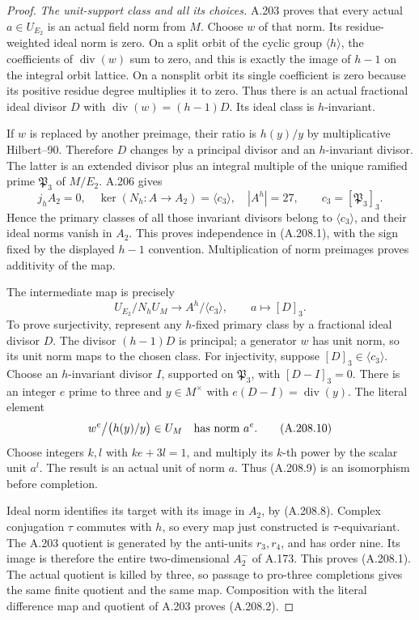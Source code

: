 \begin{proof}
\emph{The unit-support class and all its choices.}
A.203 proves that every actual \(a\in U_{E_2}\) is an actual
field norm from \(M\).  Choose \(w\) of that norm.  Its
residue-weighted ideal norm is zero.  On a split orbit of the
cyclic group \(\langle h\rangle\), the coefficients of
\(\operatorname{div}(w)\) sum to zero, and this is exactly the
image of \(h-1\) on the integral orbit lattice.  On a nonsplit
orbit its single coefficient is zero because its positive
residue degree multiplies it to zero.  Thus there is an actual
fractional ideal divisor \(D\) with
\(\operatorname{div}(w)=(h-1)D\).  Its ideal class is
\(h\)-invariant.

If \(w\) is replaced by another preimage, their ratio is
\(h(y)/y\) by multiplicative Hilbert--90.  Therefore \(D\)
changes by a principal divisor and an \(h\)-invariant divisor.
The latter is an extended divisor plus an integral multiple
of the unique ramified prime \(\mathfrak P_3\) of \(M/E_2\).
A.206 gives
\[
 j_hA_2=0,\quad
 \ker(N_h:A\to A_2)=\langle c_3\rangle,
 \quad |A^h|=27,
 \qquad c_3=[\mathfrak P_3]_3.
\tag{A.208.8}
\]
Hence the primary classes of all those invariant divisors
belong to \(\langle c_3\rangle\), and their ideal norms
vanish in \(A_2\).  This proves independence in (A.208.1),
with the sign fixed by the displayed \(h-1\) convention.
Multiplication of norm preimages proves additivity of the map.

The intermediate map is precisely
\[
 U_{E_2}/N_hU_M\longrightarrow A^h/\langle c_3\rangle,
                   \qquad a\longmapsto[D]_3.
\tag{A.208.9}
\]
To prove surjectivity, represent any \(h\)-fixed primary
class by a fractional ideal divisor \(D\).  The divisor
\((h-1)D\) is principal; a generator \(w\) has unit norm,
so its unit norm maps to the chosen class.  For injectivity,
suppose \([D]_3\in\langle c_3\rangle\).  Choose an
\(h\)-invariant divisor \(I\), supported on
\(\mathfrak P_3\), with \([D-I]_3=0\).  There is an
integer \(e\) prime to three and \(y\in M^\times\) with
\(e(D-I)=\operatorname{div}(y)\).  The literal element
\[
        w^e\big/\bigl(h(y)/y\bigr)\in U_M
                  \quad\hbox{has norm }a^e.
\tag{A.208.10}
\]
Choose integers \(k,l\) with \(ke+3l=1\), and multiply
its \(k\)-th power by the scalar unit \(a^l\).  The
result is an actual unit of norm \(a\).  Thus (A.208.9)
is an isomorphism before completion.

Ideal norm identifies its target with its image in \(A_2\),
by (A.208.8).  Complex conjugation \(\tau\) commutes with
\(h\), so every map just constructed is \(\tau\)-equivariant.
The A.203 quotient is generated by the anti-units \(r_3,r_4\),
and has order nine.  Its image is therefore the entire
two-dimensional \(A_2^-\) of A.173.  This proves
(A.208.1).  The actual quotient is killed by three, so passage
to pro-three completions gives the same finite quotient and
the same map.  Composition with the literal difference map
and quotient of A.203 proves (A.208.2).


\end{proof}
